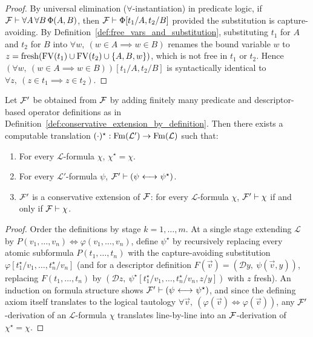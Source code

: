 \begin{proof}
By universal elimination ($\forall$-instantiation) in predicate logic, if ${\mathcal{F}} \vdash \forall A\, \forall B\, \Phi(A, B)$, then ${\mathcal{F}} \vdash \Phi[t_1/A, t_2/B]$ provided the substitution is capture-avoiding. By Definition~\ref{def:free_vars_and_substitution}, substituting $t_1$ for $A$ and $t_2$ for $B$ into $\forall w,\ (w \in A \implies w \in B)$ renames the bound variable $w$ to $z = \mathrm{fresh}(\mathrm{FV}(t_1) \cup \mathrm{FV}(t_2) \cup \{A, B, w\})$, which is not free in $t_1$ or $t_2$. Hence $(\forall w,\ (w \in A \implies w \in B))[t_1/A, t_2/B]$ is syntactically identical to $\forall z,\ (z \in t_1 \implies z \in t_2)$.
\end{proof}

\begin{theorem}
\label{thm:conservativity_of_definitions}
Let ${\mathcal{F}}'$ be obtained from ${\mathcal{F}}$ by adding finitely many predicate and descriptor-based operator definitions as in Definition~\ref{def:conservative_extension_by_definition}. Then there exists a computable translation $(\cdot)^\star : \mathrm{Fm}(\mathcal{L}') \to \mathrm{Fm}(\mathcal{L})$ such that:
\begin{enumerate}
\item For every $\mathcal{L}$-formula $\chi$, $\chi^\star = \chi$.
\item For every $\mathcal{L}'$-formula $\psi$, ${\mathcal{F}}' \vdash (\psi {\ \longleftrightarrow\ } \psi^\star)$.
\item ${\mathcal{F}}'$ is a conservative extension of ${\mathcal{F}}$: for every $\mathcal{L}$-formula $\chi$, ${\mathcal{F}}' \vdash \chi$ if and only if ${\mathcal{F}} \vdash \chi$.
\end{enumerate}
\end{theorem}

\begin{proof}
Order the definitions by stage $k = 1, \dots, m$. At a single stage extending $\mathcal{L}$ by $P(v_1, \dots, v_n) \iff \varphi(v_1, \dots, v_n)$, define $\psi^\star$ by recursively replacing every atomic subformula $P(t_1, \dots, t_n)$ with the capture-avoiding substitution $\varphi[t_1^\star/v_1, \dots, t_n^\star/v_n]$ (and for a descriptor definition $F(\vec{v}) = (\mathcal{D} y,\ \psi(\vec{v}, y))$, replacing $F(t_1, \dots, t_n)$ by $(\mathcal{D} z,\ \psi^\star[t_1^\star/v_1, \dots, t_n^\star/v_n, z/y])$ with $z$ fresh). An induction on formula structure shows ${\mathcal{F}}' \vdash (\psi {\ \longleftrightarrow\ } \psi^\star)$, and since the defining axiom itself translates to the logical tautology $\forall \vec{v},\ (\varphi(\vec{v}) \iff \varphi(\vec{v}))$, any ${\mathcal{F}}'$-derivation of an $\mathcal{L}$-formula $\chi$ translates line-by-line into an ${\mathcal{F}}$-derivation of $\chi^\star = \chi$.
\end{proof}

